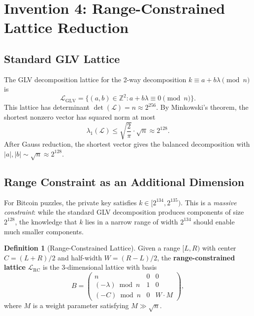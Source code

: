 \documentclass[11pt,a4paper]{article}
\theoremstyle{definition}
\newtheorem{definition}{Definition}[section]
\begin{document}
\section{Invention 4: Range-Constrained Lattice Reduction}\label{sec:lattice}

\subsection{Standard GLV Lattice}

The GLV decomposition lattice for the 2-way decomposition $k \equiv a + b\lambda \pmod{n}$ is
\begin{equation}
\mathcal{L}_{\mathrm{GLV}} = \{(a, b) \in \mathbb{Z}^2 : a + b\lambda \equiv 0 \pmod{n}\}.
\end{equation}
This lattice has determinant $\det(\mathcal{L}) = n \approx 2^{256}$. By Minkowski's theorem, the shortest nonzero vector has squared norm at most
\begin{equation}
\lambda_1(\mathcal{L}) \leq \sqrt{\frac{2}{\pi}} \cdot \sqrt{n} \approx 2^{128}.
\end{equation}
After Gauss reduction, the shortest vector gives the balanced decomposition with $|a|, |b| \sim \sqrt{n} \approx 2^{128}$.

\subsection{Range Constraint as an Additional Dimension}

For Bitcoin puzzles, the private key satisfies $k \in [2^{134}, 2^{135})$. This is a \textit{massive constraint}: while the standard GLV decomposition produces components of size $2^{128}$, the knowledge that $k$ lies in a narrow range of width $2^{134}$ should enable much smaller components.

\begin{definition}[Range-Constrained Lattice]
Given a range $[L, R)$ with center $C = (L+R)/2$ and half-width $W = (R-L)/2$, the \textbf{range-constrained lattice} $\mathcal{L}_{\mathrm{RC}}$ is the 3-dimensional lattice with basis
\begin{equation}\label{eq:rc-lattice}
B = \begin{pmatrix} n & 0 & 0 \\ (-\lambda) \bmod n & 1 & 0 \\ (-C) \bmod n & 0 & W \cdot M \end{pmatrix},
\end{equation}
where $M$ is a weight parameter satisfying $M \gg \sqrt{n}$.
\end{definition}
\end{document}
